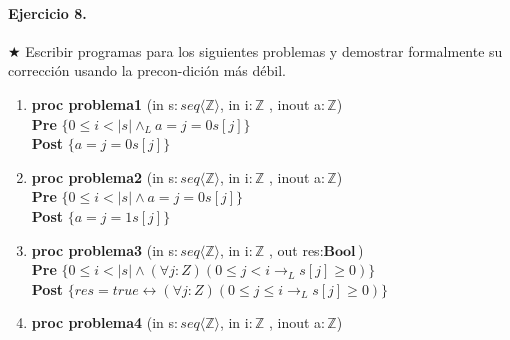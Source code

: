 \documentclass{article}
\begin{document}
\paragraph{Ejercicio 8.} $\bigstar$ Escribir programas para los siguientes problemas y demostrar 
formalmente su corrección usando la precon-dición más débil.

\begin{enumerate}[label=\alph*)]
\item \textbf{proc problema1 }(in s$: seq\langle \mathbb{Z}\rangle$, in i$:\mathbb{Z}$
	, inout a$: \mathbb{Z}$) {\\
                                   
   \hspace*{6mm} \textbf{Pre }$\{0 \leq i < |s| \wedge_L a = j=0 s[j]\}$\\
                    
   \hspace*{6mm} \textbf{Post }$\{a = j=0 s[j]\}$\\
   }

\item \textbf{proc problema2 }(in s$: seq\langle \mathbb{Z}\rangle$, in i$:\mathbb{Z}$
	, inout a$: \mathbb{Z}$) {\\
                                  
   \hspace*{6mm} \textbf{Pre }$\{0 \leq i < |s| \wedge a = j=0 s[j]\}$\\
                    
   \hspace*{6mm} \textbf{Post }$\{a = j=1 s[j]\}$\\
   }

\item \textbf{proc problema3 }(in s$: seq\langle \mathbb{Z}\rangle$, in i$:\mathbb{Z}$
	, out res$:\textbf{Bool}$) {\\
   \hspace*{6mm} \textbf{Pre }$\{0 \leq i < |s| \wedge 
   		(\forall j :Z)(0 \leq j < i \rightarrow_L s[j] \geq 0)\}$\\
   \hspace*{6mm} \textbf{Post }$\{res = true \leftrightarrow (\forall j :Z)
          (0 \leq j \leq i \rightarrow_L s[j] \geq 0)\}$\\
   }

\item \textbf{proc problema4 }(in s$: seq\langle \mathbb{Z}\rangle$, in i$:\mathbb{Z}$
	, inout a$: \mathbb{Z}$) {\\
                                   
}
\end{enumerate}
\end{document}
